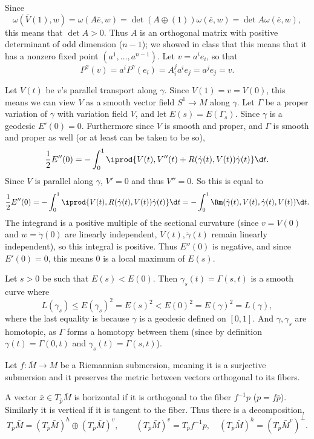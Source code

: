 Since
$$ \omega(\bar V(1),w) = \omega(A\bar e,w) = \det(A\oplus(1))\omega(\bar e,w) = \det A\omega(\bar e,w) , $$
this means that $\det A>0$.
Thus $A$ is an orthogonal matrix with positive determinant of odd dimension ($n-1$); we showed in class that this means that it has a nonzero fixed point $(a^1,\dots,a^{n-1})$.
Let $v=a^ie_i$, so that
$$ P^\gamma(v) = a^iP^\gamma(e_i) = A^j_ia^ie_j = a^je_j = v . $$

Let $V(t)$ be $v$'s parallel transport along $\gamma$.
Since $V(1)=v=V(0)$, this means we can view $V$ as a smooth vector field $S^1\to M$ along $\gamma$.
Let $\Gamma$ be a proper variation of $\gamma$ with variation field $V$, and let $E(s)=E(\Gamma_s)$.
Since $\gamma$ is a geodesic $E'(0)=0$.
Furthermore since $V$ is smooth and proper, and $\Gamma$ is smooth and proper as well (or at least can be taken to be so),
$$ \frac12E''(0) = -\int_0^1\iprod{V(t),V''(t) + R(\dot\gamma(t),V(t))\dot\gamma(t)}\d t . $$
Since $V$ is parallel along $\gamma$, $V'=0$ and thus $V''=0$.
So this is equal to
$$ \frac12E''(0) = -\int_0^1\iprod{V(t),R(\dot\gamma(t),V(t))\dot\gamma(t)}\d t = -\int_0^1\Rm(\dot\gamma(t),V(t),\dot\gamma(t),V(t))\d t . $$
The integrand is a positive multiple of the sectional curvature (since $v=V(0)$ and $w=\dot\gamma(0)$ are linearly independent, $V(t),\dot\gamma(t)$ remain linearly independent),
so this integral is positive.
Thus $E''(0)$ is negative, and since $E'(0)=0$, this means $0$ is a local maximum of $E(s)$.

Let $s>0$ be such that $E(s)<E(0)$.
Then $\gamma_s(t)=\Gamma(s,t)$ is a smooth curve where
$$ L(\gamma_s) \leq E(\gamma_s)^2 = E(s)^2 < E(0)^2 = E(\gamma)^2 = L(\gamma) , $$
where the last equality is because $\gamma$ is a geodesic defined on $[0,1]$.
And $\gamma,\gamma_s$ are homotopic, as $\Gamma$ forms a homotopy between them (since by definition $\gamma(t)=\Gamma(0,t)$ and $\gamma_s(t)=\Gamma(s,t)$).

\bprob

    Let $f\colon\bar M\to M$ be a Riemannian submersion, meaning it is a surjective submersion and it preserves the metric between vectors orthogonal to its fibers.

    A vector $\bar x\in T_{\bar p}\bar M$ is {\emphcolor horizontal} if it is orthogonal to the fiber $f^{-1}p$ ($p=f\bar p$).
    Similarly it is {\emphcolor vertical} if it is tangent to the fiber.
    Thus there is a decomposition,
    $$ T_{\bar p}\bar M = (T_{\bar p}\bar M)^h \oplus (T_{\bar p}\bar M)^v,\qquad (T_{\bar p}\bar M)^v = T_{\bar p}f^{-1}p,\quad (T_{\bar p}\bar M)^h = (T_{\bar p}\bar M^v)^\perp . $$

